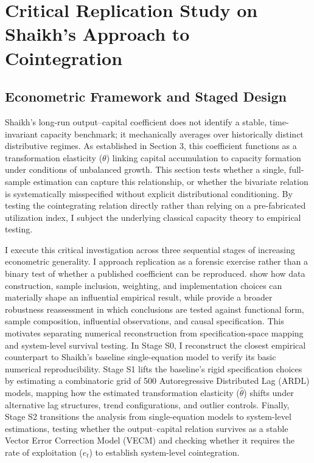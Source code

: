 \section{Critical Replication Study on Shaikh’s Approach to Cointegration}
\label{sec:replication_strategy}
\subsection{Econometric Framework and Staged Design}
\label{subsec:econometric_framework_design}

Shaikh’s long-run output–capital coefficient does not identify a stable, time-invariant capacity benchmark; it mechanically averages over historically distinct distributive regimes. As established in Section 3, this coefficient functions as a transformation elasticity ($\theta$) linking capital accumulation to capacity formation under conditions of unbalanced growth. This section tests whether a single, full-sample estimation can capture this relationship, or whether the bivariate relation is systematically misspecified without explicit distributional conditioning. By testing the cointegrating relation directly rather than relying on a pre-fabricated utilization index, I subject the underlying classical capacity theory to empirical testing.

I execute this critical investigation across three sequential stages of increasing econometric generality. I approach replication as a forensic exercise rather than a binary test of whether a published coefficient can be reproduced. \citet{HerndonAshPollin2014} show how data construction, sample inclusion, weighting, and implementation choices can materially shape an influential empirical result, while \citet{AshBasuDube2017} provide a broader robustness reassessment in which conclusions are tested against functional form, sample composition, influential observations, and causal specification. This motivates separating numerical reconstruction from specification-space mapping and system-level survival testing. In Stage S0, I reconstruct the closest empirical counterpart to Shaikh's baseline single-equation model to verify its basic numerical reproducibility. Stage S1 lifts the baseline's rigid specification choices by estimating a combinatoric grid of 500 Autoregressive Distributed Lag (ARDL) models, mapping how the estimated transformation elasticity ($\hat{\theta}$) shifts under alternative lag structures, trend configurations, and outlier controls. Finally, Stage S2 transitions the analysis from single-equation models to system-level estimations, testing whether the output--capital relation survives as a stable Vector Error Correction Model (VECM) and checking whether it requires the rate of exploitation ($e_t$) to establish system-level cointegration.

